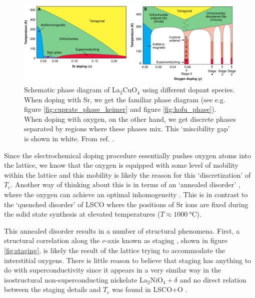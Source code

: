 \begin{figure}
    \centering
    \includegraphics[width=\textwidth]{fig/intro/phases_wells.png}
    \caption[lsco lcoo comparison]{Schematic phase diagram of La$_2$CuO$_4$ using different dopant species. When doping with Sr, we get the familiar phase diagram (see e.g. figure \ref{fig:cuprate_phase_keimer} and figure \ref{fig:kofu_phase}). When doping with oxygen, on the other hand, we get discrete phases separated by regions where these phases mix. This `miscibility gap' is shown in white. From ref. \cite{Wells1997}.}
    \label{fig:phase_wells}
\end{figure}

Since the electrochemical doping procedure essentially pushes oxygen atoms into the lattice, we know that the oxygen is equipped with some level of mobility within the lattice and this mobility is likely the reason for this `discretization' of $T_\text{c}$. Another way of thinking about this is in terms of an `annealed disorder' \cite{Wells1997}, where the oxygen can achieve an optimal inhomogeneity \cite{Poccia2012}. This is in contrast to the `quenched disorder' \cite{Wells1997} of LSCO where the positions of Sr ions are fixed during the solid state synthesis at elevated temperatures ($T \approx \SI{1000}{\celsius}$). 

This annealed disorder results in a number of structural phenomena. First, a structural correlation along the $c$-axis known as staging \cite{Wells1996}, shown in figure \ref{fig:staging}, is likely the result of the lattice trying to accommodate the interstitial oxygens. There is little reason to believe that staging has anything to do with superconductivity since it appears in a very similar way in the isostructural non-superconducting nickelate La$_2$NiO$_4+\delta$ \cite{Tranquada1994} and no direct relation between the staging details and $T_c$ was found in LSCO+O \cite{Ray2017}.

